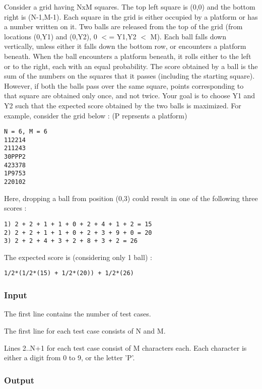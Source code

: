 



   Consider a grid having NxM squares. The top left square is (0,0) and the bottom right is (N-1,M-1). Each square in the grid is either occupied by a platform or has a number written on it. Two balls are released from the top of the grid (from locations (0,Y1) and (0,Y2), 0 $<$= Y1,Y2 $<$ M). Each ball falls down vertically, unless either it falls down the bottom row, or encounters a platform beneath. When the ball encounters a platform beneath, it rolls either to the left or to the right, each with an equal probability. The score obtained by a ball is the sum of the numbers on the squares that it passes (including the starting square). However, if both the balls pass over the same square, points corresponding to that square are obtained only once, and not twice. Your goal is to choose Y1 and Y2 such that the expected score obtained by the two balls is maximized. For example, consider the grid below : (P reprsents a platform)  
\begin{verbatim}
N = 6, M = 6
112214
211243
30PPP2
423378
1P9753
220102
\end{verbatim}

   Here, dropping a ball from position (0,3) could result in one of the following three scores :  
\begin{verbatim}
1) 2 + 2 + 1 + 1 + 0 + 2 + 4 + 1 + 2 = 15 
2) 2 + 2 + 1 + 1 + 0 + 2 + 3 + 9 + 0 = 20
3) 2 + 2 + 4 + 3 + 2 + 8 + 3 + 2 = 26
\end{verbatim}

   The expected score is (considering only 1 ball) :  
\begin{verbatim}
1/2*(1/2*(15) + 1/2*(20)) + 1/2*(26)\end{verbatim}

\subsubsection{   Input  }

   The first line contains the number of test cases.  

   The first line for each test case consists of N and M.  

   Lines 2..N+1 for each test case consist of M characters each. Each character is either a digit from 0 to 9, or the letter 'P'.  

\subsubsection{   Output  }

